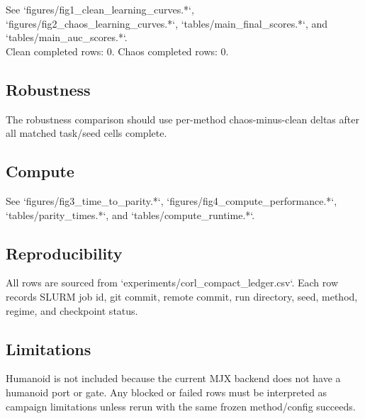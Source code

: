 \documentclass{article}
\begin{document}
See `figures/fig1\_clean\_learning\_curves.*`, `figures/fig2\_chaos\_learning\_curves.*`, `tables/main\_final\_scores.*`, and `tables/main\_auc\_scores.*`.\\

Clean completed rows: 0. Chaos completed rows: 0.\\

\subsection*{Robustness}

The robustness comparison should use per-method chaos-minus-clean deltas after all matched task/seed cells complete.\\

\subsection*{Compute}

See `figures/fig3\_time\_to\_parity.*`, `figures/fig4\_compute\_performance.*`, `tables/parity\_times.*`, and `tables/compute\_runtime.*`.\\

\subsection*{Reproducibility}

All rows are sourced from `experiments/corl\_compact\_ledger.csv`. Each row records SLURM job id, git commit, remote commit, run directory, seed, method, regime, and checkpoint status.\\

\subsection*{Limitations}

Humanoid is not included because the current MJX backend does not have a humanoid port or gate. Any blocked or failed rows must be interpreted as campaign limitations unless rerun with the same frozen method/config succeeds.\\
\end{document}
